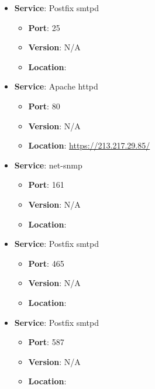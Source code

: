\documentclass{article}
\begin{document}
\begin{itemize}
    
        \item \textbf{Service}: Postfix smtpd
        \begin{itemize}
            \item \textbf{Port}: 25
            \item \textbf{Version}:  N/A 
            \item \textbf{Location}: \href{  }{  }
        \end{itemize}
    
        \item \textbf{Service}: Apache httpd
        \begin{itemize}
            \item \textbf{Port}: 80
            \item \textbf{Version}:  N/A 
            \item \textbf{Location}: \href{ https://213.217.29.85/ }{ https://213.217.29.85/ }
        \end{itemize}
    
        \item \textbf{Service}: net-snmp
        \begin{itemize}
            \item \textbf{Port}: 161
            \item \textbf{Version}:  N/A 
            \item \textbf{Location}: \href{  }{  }
        \end{itemize}
    
        \item \textbf{Service}: Postfix smtpd
        \begin{itemize}
            \item \textbf{Port}: 465
            \item \textbf{Version}:  N/A 
            \item \textbf{Location}: \href{  }{  }
        \end{itemize}
    
        \item \textbf{Service}: Postfix smtpd
        \begin{itemize}
            \item \textbf{Port}: 587
            \item \textbf{Version}:  N/A 
            \item \textbf{Location}: \href{  }{  }
        \end{itemize}
    
\end{itemize}
\end{document}
